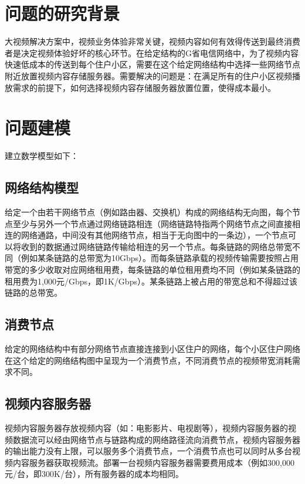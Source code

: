 \documentclass[a4paper,11pt,onecolumn,twoside]{article}
\begin{document}
\begin{multicols}{2}
\section{问题的研究背景}

大视频解决方案中，视频业务体验非常关键，视频内容如何有效得传送到最终消费者是决定视频体验好坏的核心环节。在给定结构的G省电信网络中，为了视频内容快速低成本的传送到每个住户小区，需要在这个给定网络结构中选择一些网络节点附近放置视频内容存储服务器。需要解决的问题是：在满足所有的住户小区视频播放需求的前提下，如何选择视频内容存储服务器放置位置，使得成本最小。

\section{问题建模}

建立数学模型如下：

\subsection{网络结构模型}
给定一个由若干网络节点（例如路由器、交换机）构成的网络结构无向图，每个节点至少与另外一个节点通过网络链路相连（网络链路特指两个网络节点之间直接相连的网络通路，中间没有其他网络节点，相当于无向图中的一条边），一个节点可以将收到的数据通过网络链路传输给相连的另一个节点。每条链路的网络总带宽不同（例如某条链路的总带宽为10Gbps）。而每条链路承载的视频传输需要按照占用带宽的多少收取对应网络租用费，每条链路的单位租用费均不同（例如某条链路的租用费为1,000元/Gbps，即1K/Gbps）。某条链路上被占用的带宽总和不得超过该链路的总带宽。

\subsection{消费节点}
给定的网络结构中有部分网络节点直接连接到小区住户的网络，每个小区住户网络在这个给定的网络结构图中呈现为一个消费节点，不同消费节点的视频带宽消耗需求不同。

\subsection{视频内容服务器}
视频内容服务器存放视频内容（如：电影影片、电视剧等），视频内容服务器的视频数据流可以经由网络节点与链路构成的网络路径流向消费节点，视频内容服务器的输出能力没有上限，可以服务多个消费节点，一个消费节点也可以同时从多台视频内容服务器获取视频流。部署一台视频内容服务器需要费用成本（例如300,000元/台，即300K/台），所有服务器的成本均相同。


\end{multicols}
\end{document}
